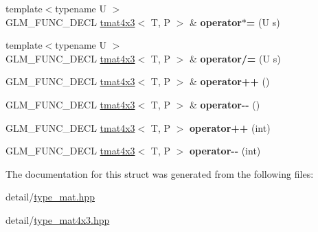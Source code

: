 \begin{DoxyCompactItemize}
\item 
\hypertarget{structglm_1_1tmat4x3_a49f3e365fca15f32e4607d209648bb49}{{\footnotesize template$<$typename U $>$ }\\G\-L\-M\-\_\-\-F\-U\-N\-C\-\_\-\-D\-E\-C\-L \hyperlink{structglm_1_1tmat4x3}{tmat4x3}$<$ T, P $>$ \& {\bfseries operator$\ast$=} (U s)}\label{structglm_1_1tmat4x3_a49f3e365fca15f32e4607d209648bb49}

\item 
\hypertarget{structglm_1_1tmat4x3_a42098fc1e415bf49d41c274f7de91670}{{\footnotesize template$<$typename U $>$ }\\G\-L\-M\-\_\-\-F\-U\-N\-C\-\_\-\-D\-E\-C\-L \hyperlink{structglm_1_1tmat4x3}{tmat4x3}$<$ T, P $>$ \& {\bfseries operator/=} (U s)}\label{structglm_1_1tmat4x3_a42098fc1e415bf49d41c274f7de91670}

\item 
\hypertarget{structglm_1_1tmat4x3_ab6bb9e181faae165c5285afb610706ed}{G\-L\-M\-\_\-\-F\-U\-N\-C\-\_\-\-D\-E\-C\-L \hyperlink{structglm_1_1tmat4x3}{tmat4x3}$<$ T, P $>$ \& {\bfseries operator++} ()}\label{structglm_1_1tmat4x3_ab6bb9e181faae165c5285afb610706ed}

\item 
\hypertarget{structglm_1_1tmat4x3_a5e7d5dd8168a234d9b235a6b88fec76a}{G\-L\-M\-\_\-\-F\-U\-N\-C\-\_\-\-D\-E\-C\-L \hyperlink{structglm_1_1tmat4x3}{tmat4x3}$<$ T, P $>$ \& {\bfseries operator-\/-\/} ()}\label{structglm_1_1tmat4x3_a5e7d5dd8168a234d9b235a6b88fec76a}

\item 
\hypertarget{structglm_1_1tmat4x3_aa5834890a2348aabc9742ed480f3e924}{G\-L\-M\-\_\-\-F\-U\-N\-C\-\_\-\-D\-E\-C\-L \hyperlink{structglm_1_1tmat4x3}{tmat4x3}$<$ T, P $>$ {\bfseries operator++} (int)}\label{structglm_1_1tmat4x3_aa5834890a2348aabc9742ed480f3e924}

\item 
\hypertarget{structglm_1_1tmat4x3_aaefa1459e2a347f186e37429cf8b6548}{G\-L\-M\-\_\-\-F\-U\-N\-C\-\_\-\-D\-E\-C\-L \hyperlink{structglm_1_1tmat4x3}{tmat4x3}$<$ T, P $>$ {\bfseries operator-\/-\/} (int)}\label{structglm_1_1tmat4x3_aaefa1459e2a347f186e37429cf8b6548}

\end{DoxyCompactItemize}


The documentation for this struct was generated from the following files\-:\begin{DoxyCompactItemize}
\item 
detail/\hyperlink{type__mat_8hpp}{type\-\_\-mat.\-hpp}\item 
detail/\hyperlink{type__mat4x3_8hpp}{type\-\_\-mat4x3.\-hpp}\end{DoxyCompactItemize}
